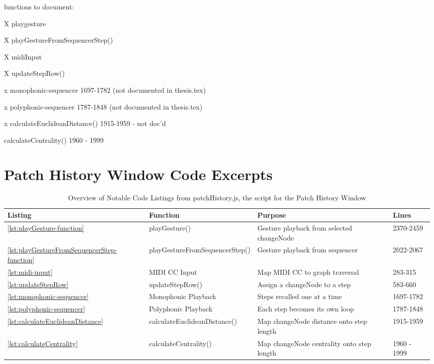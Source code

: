 functions to document:

X playgesture

X playGestureFromSequencerStep()

X midiInput

X updateStepRow()

x monophonic-sequencer 1697-1782 (not documented in thesis.tex)

x polyphonic-sequencer 1787-1848 (not documented in thesis.tex)

x calculateEuclideanDistance() 1915-1959 - not doc'd

calculateCentrality()  1960 - 1999

\chapter{Patch History Window Code Excerpts}
\label{app:patchHistoryExcerpts}

\begin{table}[h]
  \centering
  \caption{Overview of Notable Code Listings from patchHistory.js, the script for the Patch History Window}
  \begin{tabular}{@{}llll@{}}
    \toprule
    \textbf{Listing} & \textbf{Function} & \textbf{Purpose} & \textbf{Lines} \\
    \midrule
        \ref{lst:playGesture-function} & playGesture() & Gesture playback from selected changeNode & 2370-2459 \\
        \ref{lst:playGestureFromSequencerStep-function} & playGestureFromSequencerStep() & Gesture playback from sequencer & 2022-2067 \\
        \ref{lst:midi-input} & MIDI CC Input & Map MIDI CC to graph traversal & 283-315 \\
        \ref{lst:updateStepRow} & updateStepRow() & Assign a changeNode to a step & 583-660 \\
        \ref{lst:monophonic-sequencer} & Monophonic Playback & Steps recalled one at a time & 1697-1782 \\
        \ref{lst:polyphonic-sequencer} & Polyphonic Playback & Each step becomes its own loop & 1787-1848 \\
        \ref{lst:calculateEuclideanDistance} & calculateEuclideanDistance() & Map changeNode distance onto step length & 1915-1959 \\
        \ref{lst:calculateCentrality} & calculateCentrality() & Map changeNode centrality onto step length & 1960 - 1999 \\

    \bottomrule
  \end{tabular}
\end{table}



